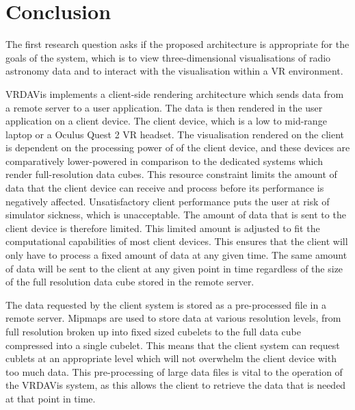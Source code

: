 \section{Conclusion}
\label{sec:conclusion}
The first research question asks if the proposed architecture is appropriate for the goals of the system, which is to view three-dimensional visualisations of radio astronomy data and to interact with the visualisation within a VR environment.

VRDAVis implements a client-side rendering architecture which sends data from a remote server to a user application.
The data is then rendered in the user application on a client device.
The client device, which is a low to mid-range laptop or a Oculus Quest 2 VR headset.
The visualisation rendered on the client is dependent on the processing power of of the client device, and these devices are comparatively lower-powered in comparison to the dedicated systems which render full-resolution data cubes.
This resource constraint limits the amount of data that the client device can receive and process before its performance is negatively affected.
Unsatisfactory client performance puts the user at risk of simulator sickness, which is unacceptable.
The amount of data that is sent to the client device is therefore limited.
This limited amount is adjusted to fit the computational capabilities of most client devices.
This ensures that the client will only have to process a fixed amount of data at any given time.
The same amount of data will be sent to the client at any given point in time regardless of the size of the full resolution data cube stored in the remote server.

The data requested by the client system is stored as a pre-processed file in a remote server.
Mipmaps are used to store data at various resolution levels, from full resolution broken up into fixed sized cubelets to the full data cube compressed into a single cubelet.
This means that the client system can request cublets at an appropriate level which will not overwhelm the client device with too much data.
This pre-processing of large data files is vital to the operation of the VRDAVis system, as this allows the client to retrieve the data that is needed at that point in time.

